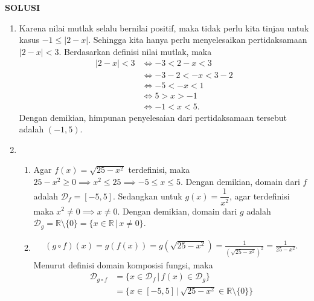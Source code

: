 \documentclass[11pt,openany,a4paper]{article}
\renewcommand{\headrulewidth}{0pt}
\newcommand{\R}{\mathbb{R}}
\begin{document}
\newpage
\fancyfoot{}
{\centering\textbf{SOLUSI}}
\renewcommand{\arraystretch}{1.5}
\renewcommand{\headrulewidth}{1pt}
\begin{enumerate}
    \item Karena nilai mutlak selalu bernilai positif, maka tidak perlu kita tinjau untuk kasus $-1 \leq |2 - x|$. Sehingga kita hanya perlu menyelesaikan pertidaksamaan $|2 - x| < 3$. Berdasarkan definisi nilai mutlak, maka
          \begin{align*}
              |2 - x| < 3 & \iff -3 < 2 - x < 3      \\
                          & \iff -3 - 2 < -x < 3 - 2 \\
                          & \iff -5 < -x < 1         \\
                          & \iff 5 > x > -1          \\
                          & \iff -1 < x < 5.
          \end{align*}
          Dengan demikian, himpunan penyelesaian dari pertidaksamaan tersebut adalah $(-1,5)$.
    \item \begin{enumerate}
              \item Agar $f(x) = \sqrt{25 - x^2}$ terdefinisi, maka $25 - x^2 \geq 0 \implies x^2 \leq 25 \implies -5 \leq x \leq 5$. Dengan demikian, domain dari $f$ adalah $\mathcal{D}_f = [-5,5]$. Sedangkan untuk $g(x) = \dfrac{1}{x^2}$, agar terdefinisi maka $x^2 \neq 0 \implies x \neq 0$. Dengan demikian, domain dari $g$ adalah $\mathcal{D}_g = \R \setminus \{0\}=\{x \in \R \,|\, x \ne 0\}$.
              \item \begin{align*}
                        (g \circ f)(x)  = g(f(x))
                        = g(\sqrt{25 - x^2})
                        = \frac{1}{(\sqrt{25 - x^2})^2}
                        = \frac{1}{25 - x^2}.
                    \end{align*}
                    Menurut definisi domain komposisi fungsi, maka
                    \begin{align*}
                        \mathcal{D}_{g \circ f} & = \{x \in \mathcal{D}_f \,|\, f(x) \in \mathcal{D}_g\}        \\
                                                & = \{x \in [-5,5] \,|\, \sqrt{25 - x^2} \in \R\setminus\{0\}\} \\

\end{align*}
\end{enumerate}
\end{enumerate}
\end{document}
